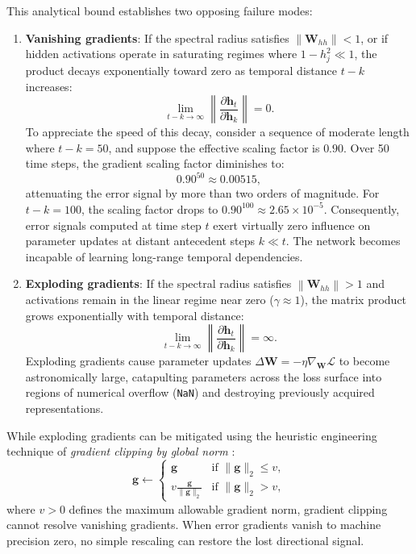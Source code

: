 \documentclass[../../../main.tex]{subfiles}
\begin{document}
This analytical bound establishes two opposing failure modes:
\begin{enumerate}
    \item \textbf{Vanishing gradients}: If the spectral radius satisfies $\left\| \mathbf{W}_{hh} \right\| < 1$, or if hidden activations operate in saturating regimes where $1 - h_j^2 \ll 1$, the product decays exponentially toward zero as temporal distance $t - k$ increases:
    \begin{equation}
    \lim_{t - k \to \infty} \left\| \frac{\partial \mathbf{h}_t}{\partial \mathbf{h}_k} \right\| = 0.
    \end{equation}
    To appreciate the speed of this decay, consider a sequence of moderate length where $t - k = 50$, and suppose the effective scaling factor is $0.90$. Over 50 time steps, the gradient scaling factor diminishes to:
    \begin{equation}
    0.90^{50} \approx 0.00515,
    \end{equation}
    attenuating the error signal by more than two orders of magnitude. For $t - k = 100$, the scaling factor drops to $0.90^{100} \approx 2.65 \times 10^{-5}$. Consequently, error signals computed at time step $t$ exert virtually zero influence on parameter updates at distant antecedent steps $k \ll t$. The network becomes incapable of learning long-range temporal dependencies.
    
    \item \textbf{Exploding gradients}: If the spectral radius satisfies $\left\| \mathbf{W}_{hh} \right\| > 1$ and activations remain in the linear regime near zero ($\gamma \approx 1$), the matrix product grows exponentially with temporal distance:
    \begin{equation}
    \lim_{t - k \to \infty} \left\| \frac{\partial \mathbf{h}_t}{\partial \mathbf{h}_k} \right\| = \infty.
    \end{equation}
    Exploding gradients cause parameter updates $\Delta \mathbf{W} = -\eta \nabla_{\mathbf{W}} \mathcal{L}$ to become astronomically large, catapulting parameters across the loss surface into regions of numerical overflow (\texttt{NaN}) and destroying previously acquired representations.
\end{enumerate}

While exploding gradients can be mitigated using the heuristic engineering technique of \textit{gradient clipping by global norm} \citep{pascanu2013difficulty}:
\begin{equation}
\mathbf{g} \leftarrow \begin{cases}
\mathbf{g} & \text{if } \|\mathbf{g}\|_2 \le v, \\
v \frac{\mathbf{g}}{\|\mathbf{g}\|_2} & \text{if } \|\mathbf{g}\|_2 > v,
\end{cases}
\label{eq:gradient_clipping}
\end{equation}
where $v > 0$ defines the maximum allowable gradient norm, gradient clipping cannot resolve vanishing gradients. When error gradients vanish to machine precision zero, no simple rescaling can restore the lost directional signal.
\end{document}
